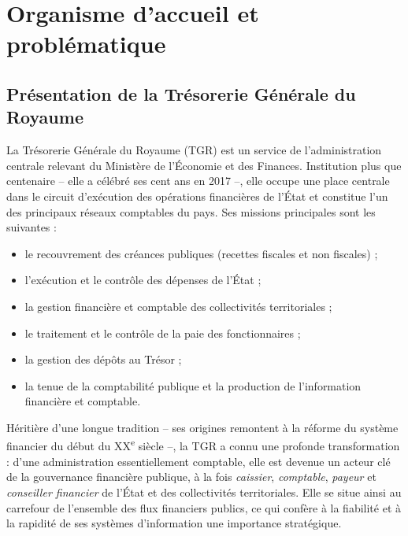 \documentclass[a4paper,12pt,oneside]{report}
\begin{document}
\chapter{Organisme d'accueil et problématique}

\section{Présentation de la Trésorerie Générale du Royaume}
La Trésorerie Générale du Royaume (TGR) est un service de l'administration
centrale relevant du Ministère de l'Économie et des Finances. Institution plus
que centenaire -- elle a célébré ses cent ans en 2017 --, elle occupe une place
centrale dans le circuit d'exécution des opérations financières de l'État et
constitue l'un des principaux réseaux comptables du pays. Ses missions
principales sont les suivantes :

\begin{itemize}
  \item le recouvrement des créances publiques (recettes fiscales et non fiscales) ;
  \item l'exécution et le contrôle des dépenses de l'État ;
  \item la gestion financière et comptable des collectivités territoriales ;
  \item le traitement et le contrôle de la paie des fonctionnaires ;
  \item la gestion des dépôts au Trésor ;
  \item la tenue de la comptabilité publique et la production de l'information
  financière et comptable.
\end{itemize}

Héritière d'une longue tradition -- ses origines remontent à la réforme du
système financier du début du XX\textsuperscript{e} siècle --, la TGR a connu une
profonde transformation : d'une
administration essentiellement comptable, elle est devenue un acteur clé de la
gouvernance financière publique, à la fois \emph{caissier}, \emph{comptable},
\emph{payeur} et \emph{conseiller financier} de l'État et des collectivités
territoriales. Elle se situe ainsi au carrefour de l'ensemble des flux financiers
publics, ce qui confère à la fiabilité et à la rapidité de ses systèmes
d'information une importance stratégique.
\end{document}
